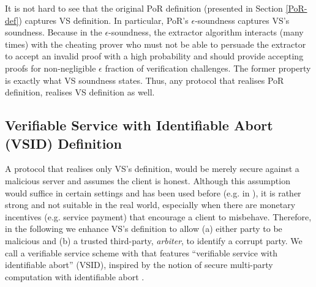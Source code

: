 \begin{remark}
It is not hard to see that the original PoR definition (presented in Section \ref{PoR-def}) captures VS definition. In particular, PoR's $\epsilon$-soundness captures VS's soundness.  Because in the $\epsilon$-soundness, the extractor algorithm interacts (many times) with the cheating prover  who must not be able to persuade the extractor to accept an invalid proof with a high probability and should provide  accepting proofs for non-negligible $\epsilon$ fraction of verification challenges.  The former property is exactly what VS soundness states. Thus, any protocol that realises PoR definition, realises VS definition as well. 
\end{remark}




\subsection{Verifiable Service with Identifiable Abort (VSID) Definition}\label{subsec:VSID}


A protocol that realises only VS's definition, would be merely secure against a malicious server and  assumes the client is honest.  Although this  assumption would suffice in certain settings and has been used before (e.g. in \cite{}), it is rather strong and not suitable in the real world, especially when there are monetary incentives (e.g. service payment)  that encourage a client to misbehave. Therefore, in the following we enhance VS's definition to allow  (a) either party to be malicious and (b) a trusted third-party, \emph{arbiter}, to identify a corrupt party. We call a verifiable service scheme with that features ``verifiable service with identifiable abort'' (VSID), inspired by the notion of secure multi-party computation with identifiable abort \cite{DBLP:conf/crypto/IshaiOZ14}. 






\



